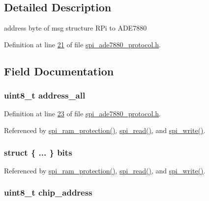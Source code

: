 \subsection{Detailed Description}
address byte of msg structure R\-Pi to A\-D\-E7880 

Definition at line \hyperlink{a00041_source_l00021}{21} of file \hyperlink{a00041_source}{spi\-\_\-ade7880\-\_\-protocol.\-h}.



\subsection{Field Documentation}
\hypertarget{a00011_a7bf6defa0ae3fb2bca057a3a97d4f740}{
\subsubsection[{address\-\_\-all}]{\setlength{\rightskip}{0pt plus 5cm}uint8\-\_\-t address\-\_\-all}}\label{da/d45/a00011_a7bf6defa0ae3fb2bca057a3a97d4f740}


Definition at line \hyperlink{a00041_source_l00023}{23} of file \hyperlink{a00041_source}{spi\-\_\-ade7880\-\_\-protocol.\-h}.



Referenced by \hyperlink{a00040_source_l00343}{spi\-\_\-ram\-\_\-protection()}, \hyperlink{a00040_source_l00147}{spi\-\_\-read()}, and \hyperlink{a00040_source_l00221}{spi\-\_\-write()}.

\hypertarget{a00011_ae121725fb28cc26495969d71e0e0d42e}{
\subsubsection[{bits}]{\setlength{\rightskip}{0pt plus 5cm}struct \{ ... \}  bits}}\label{da/d45/a00011_ae121725fb28cc26495969d71e0e0d42e}


Referenced by \hyperlink{a00040_source_l00343}{spi\-\_\-ram\-\_\-protection()}, \hyperlink{a00040_source_l00147}{spi\-\_\-read()}, and \hyperlink{a00040_source_l00221}{spi\-\_\-write()}.

\hypertarget{a00011_a935ee6f74a5c245878a724b16c4b06b7}{
\subsubsection[{chip\-\_\-address}]{\setlength{\rightskip}{0pt plus 5cm}uint8\-\_\-t chip\-\_\-address}}\label{da/d45/a00011_a935ee6f74a5c245878a724b16c4b06b7}


